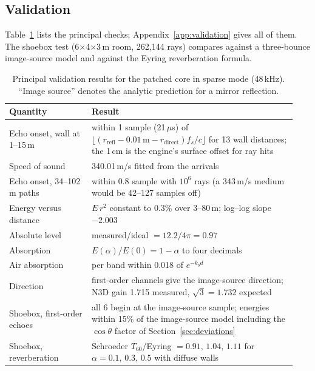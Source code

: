 \documentclass[10pt]{article}
\begin{document}
\subsection{Validation}
\label{sec:validation}
Table~\ref{tab:validation} lists the principal checks; Appendix~\ref{app:validation} gives all of them. The shoebox test (6$\times$4$\times$3\,m room, 262{,}144 rays) compares against a three-bounce image-source model \citep{allen1979image} and against the Eyring reverberation formula.

\begin{table}[t]
\caption{Principal validation results for the patched core in sparse mode (48\,kHz). ``Image source'' denotes the analytic prediction for a mirror reflection.}
\label{tab:validation}
\centering\small
\begin{tabular}{p{0.27\linewidth}p{0.67\linewidth}}
\toprule
Quantity & Result \\
\midrule
Echo onset, wall at 1--15\,m & within 1 sample (21\,$\mu$s) of $\lfloor (r_\text{refl}-0.01\,\text{m}-r_\text{direct})f_s/c\rfloor$ for 13 wall distances; the 1\,cm is the engine's surface offset for ray hits \\
Speed of sound & 340.01\,m/s fitted from the arrivals \\
Echo onset, 34--102\,m paths & within 0.8 sample with $10^6$ rays (a 343\,m/s medium would be 42--127 samples off) \\
Energy versus distance & $E\,r^2$ constant to 0.3\% over 3--80\,m; log--log slope $-2.003$ \\
Absolute level & measured/ideal $= 12.2/4\pi = 0.97$ \\
Absorption & $E(\alpha)/E(0) = 1-\alpha$ to four decimals \\
Air absorption & per band within 0.018 of $e^{-k_b d}$ \\
Direction & first-order channels give the image-source direction; N3D gain 1.715 measured, $\sqrt3=1.732$ expected \\
Shoebox, first-order echoes & all 6 begin at the image-source sample; energies within 15\% of the image-source model including the $\cos\theta$ factor of Section~\ref{sec:deviations} \\
Shoebox, reverberation & Schroeder $T_{60}$/Eyring $=0.91,\,1.04,\,1.11$ for $\alpha=0.1,\,0.3,\,0.5$ with diffuse walls \\
\bottomrule
\end{tabular}
\end{table}
\end{document}
